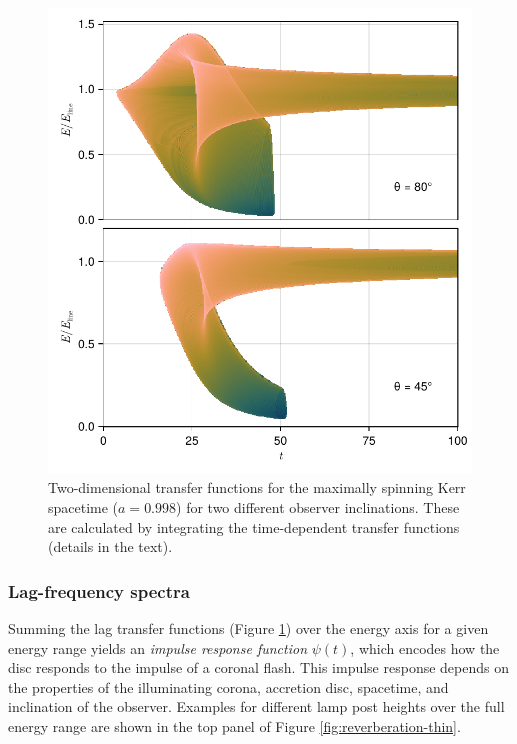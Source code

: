 \documentclass[fleqn,usenatbib]{mnras}
\begin{document}
\begin{figure}
	\centering
	\includegraphics[width=0.97\linewidth]{figures/transfer-functions.2d.pdf}
    \caption{Two-dimensional transfer functions for the maximally spinning Kerr
    spacetime ($a = 0.998$) for two different observer inclinations. These are
    calculated by integrating the time-dependent transfer functions (details in
the text).}
	\label{fig:lag-frequency-transfer-functions}
\end{figure}

\subsubsection{Lag-frequency spectra}


Summing the lag transfer functions (Figure
\ref{fig:lag-frequency-transfer-functions}) over the energy axis for a given
energy range yields an \textit{impulse response function} $\psi(t)$, which
encodes how the disc responds to the impulse of a coronal flash. This impulse
response depends on the properties of the illuminating corona, accretion disc,
spacetime, and inclination of the observer. Examples for different lamp post
heights over the full energy range are shown in the top panel of Figure
\ref{fig:reverberation-thin}.
\end{document}

